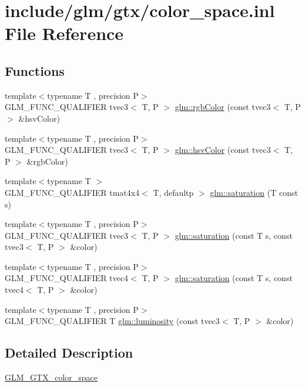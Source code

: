 \hypertarget{gtx_2color__space_8inl}{}\section{include/glm/gtx/color\+\_\+space.inl File Reference}
\label{gtx_2color__space_8inl}
\subsection*{Functions}
\begin{DoxyCompactItemize}
\item 
{\footnotesize template$<$typename T , precision P$>$ }\\G\+L\+M\+\_\+\+F\+U\+N\+C\+\_\+\+Q\+U\+A\+L\+I\+F\+I\+ER tvec3$<$ T, P $>$ \hyperlink{group__gtx__color__space_ga36b0619e31daf57bc4a54dac2dcf34b7}{glm\+::rgb\+Color} (const tvec3$<$ T, P $>$ \&hsv\+Color)
\item 
{\footnotesize template$<$typename T , precision P$>$ }\\G\+L\+M\+\_\+\+F\+U\+N\+C\+\_\+\+Q\+U\+A\+L\+I\+F\+I\+ER tvec3$<$ T, P $>$ \hyperlink{group__gtx__color__space_gae72039c00a7be2f03a3b94b37a54349a}{glm\+::hsv\+Color} (const tvec3$<$ T, P $>$ \&rgb\+Color)
\item 
{\footnotesize template$<$typename T $>$ }\\G\+L\+M\+\_\+\+F\+U\+N\+C\+\_\+\+Q\+U\+A\+L\+I\+F\+I\+ER tmat4x4$<$ T, defaultp $>$ \hyperlink{group__gtx__color__space_gafecfb15d58da8445103745af3348e516}{glm\+::saturation} (T const s)
\item 
{\footnotesize template$<$typename T , precision P$>$ }\\G\+L\+M\+\_\+\+F\+U\+N\+C\+\_\+\+Q\+U\+A\+L\+I\+F\+I\+ER tvec3$<$ T, P $>$ \hyperlink{group__gtx__color__space_ga632ee8dadb44e90a05885f6f8c07d46c}{glm\+::saturation} (const T s, const tvec3$<$ T, P $>$ \&color)
\item 
{\footnotesize template$<$typename T , precision P$>$ }\\G\+L\+M\+\_\+\+F\+U\+N\+C\+\_\+\+Q\+U\+A\+L\+I\+F\+I\+ER tvec4$<$ T, P $>$ \hyperlink{group__gtx__color__space_ga2033e0566c595230714af396744e8a61}{glm\+::saturation} (const T s, const tvec4$<$ T, P $>$ \&color)
\item 
{\footnotesize template$<$typename T , precision P$>$ }\\G\+L\+M\+\_\+\+F\+U\+N\+C\+\_\+\+Q\+U\+A\+L\+I\+F\+I\+ER T \hyperlink{group__gtx__color__space_gaa2f38a5100c3e1c7d39920df43bd8cbe}{glm\+::luminosity} (const tvec3$<$ T, P $>$ \&color)
\end{DoxyCompactItemize}


\subsection{Detailed Description}
\hyperlink{group__gtx__color__space}{G\+L\+M\+\_\+\+G\+T\+X\+\_\+color\+\_\+space} 